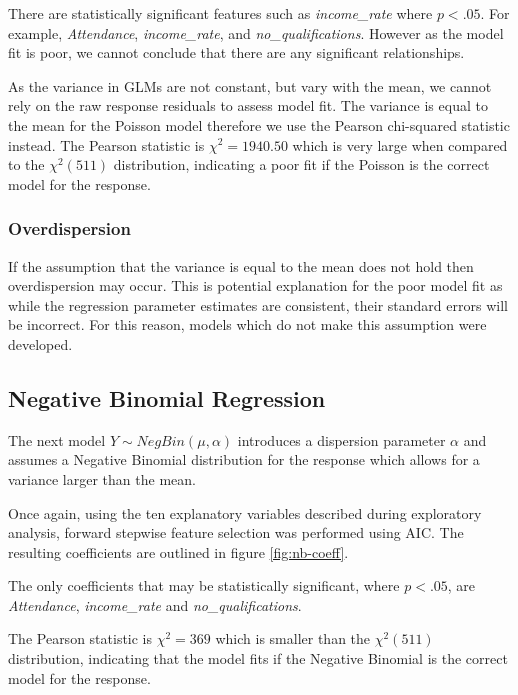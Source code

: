\documentclass{thesis}
\begin{document}
There are statistically significant features such as \textit{income\_rate} where $p < .05$. For example, \textit{Attendance}, \textit{income\_rate}, and \textit{no\_qualifications}. However as the model fit is poor, we cannot conclude that there are any significant relationships.

As the variance in GLMs are not constant, but vary with the mean, we cannot rely on the raw response residuals to assess model fit. The variance is equal to the mean for the Poisson model therefore we use the Pearson chi-squared statistic instead. The Pearson statistic is $\chi^2 = 1940.50$ which is very large when compared to the $\chi^2(511)$ distribution, indicating a poor fit if the Poisson is the correct model for the response.

\subsubsection{Overdispersion}

If the assumption that the variance is equal to the mean does not hold then overdispersion may occur. This is potential explanation for the poor model fit as while the regression parameter estimates are consistent, their standard errors will be incorrect. For this reason, models which do not make this assumption were developed.

\subsection{Negative Binomial Regression}

The next model $Y \sim NegBin(\mu, \alpha)$ introduces a dispersion parameter $\alpha$ and assumes a Negative Binomial distribution for the response which allows for a variance larger than the mean.

Once again, using the ten explanatory variables described during exploratory analysis, forward stepwise feature selection was performed using AIC. The resulting coefficients are outlined in figure \ref{fig:nb-coeff}.

The only coefficients that may be statistically significant, where $p < .05$, are \textit{Attendance}, \textit{income\_rate} and \textit{no\_qualifications}.

The Pearson statistic is $\chi^2 = 369$ which is smaller than the $\chi^2(511)$ distribution, indicating that the model fits if the Negative Binomial is the correct model for the response.
\end{document}
